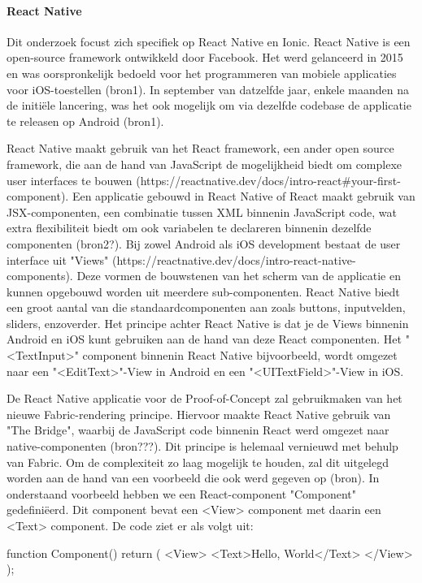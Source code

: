\paragraph{React Native}

Dit onderzoek focust zich specifiek op React Native en Ionic. React Native is een open-source framework ontwikkeld door Facebook. Het werd gelanceerd in 2015 en was oorspronkelijk bedoeld voor het programmeren van mobiele applicaties voor iOS-toestellen (bron1). In september van datzelfde jaar, enkele maanden na de initiële lancering, was het ook mogelijk om via dezelfde codebase de applicatie te releasen op Android (bron1).

React Native maakt gebruik van het React framework, een ander open source framework, die aan de hand van JavaScript de mogelijkheid biedt om complexe user interfaces te bouwen (https://reactnative.dev/docs/intro-react#your-first-component). Een applicatie gebouwd in React Native of React maakt gebruik van JSX-componenten, een combinatie tussen XML binnenin JavaScript code, wat extra flexibiliteit biedt om ook variabelen te declareren binnenin dezelfde componenten (bron2?). Bij zowel Android als iOS development bestaat de user interface uit "Views" (https://reactnative.dev/docs/intro-react-native-components). Deze vormen de bouwstenen van het scherm van de applicatie en kunnen opgebouwd worden uit meerdere sub-componenten. React Native biedt een groot aantal van die standaardcomponenten aan zoals buttons, inputvelden, sliders, enzoverder. Het principe achter React Native is dat je de Views binnenin Android en iOS kunt gebruiken aan de hand van deze React componenten. Het "<TextInput>" component binnenin React Native bijvoorbeeld, wordt omgezet naar een "<EditText>"-View in Android en een "<UITextField>"-View in iOS.

De React Native applicatie voor de Proof-of-Concept zal gebruikmaken van het nieuwe Fabric-rendering principe. Hiervoor maakte React Native gebruik van "The Bridge", waarbij de JavaScript code binnenin React werd omgezet naar native-componenten (bron???). Dit principe is helemaal vernieuwd met behulp van Fabric. Om de complexiteit zo laag mogelijk te houden, zal dit uitgelegd worden aan de hand van een voorbeeld die ook werd gegeven op (bron). In onderstaand voorbeeld hebben we een React-component "Component" gedefiniëerd. Dit component bevat een <View> component met daarin een <Text> component. De code ziet er als volgt uit:

\begin{LVerbatim}
function Component() {
  return (
    <View>
      <Text>Hello, World</Text>
    </View>
  );
}
\end{LVerbatim}

